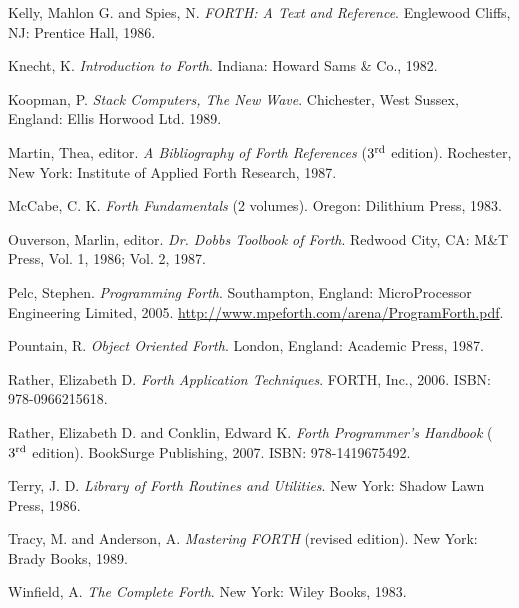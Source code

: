\begin{description}
\begin{description}
	\item Kelly, Mahlon G. and Spies, N.
		\emph{FORTH: A Text and Reference}.
		Englewood Cliffs, NJ: Prentice Hall, 1986.

	\item Knecht, K.
		\emph{Introduction to Forth}.
		Indiana: Howard Sams \& Co., 1982.

	\item Koopman, P.
		\emph{Stack Computers, The New Wave}.
		Chichester, West Sussex, England: Ellis Horwood Ltd. 1989.

	\item Martin, Thea, editor.
		\emph{A Bibliography of Forth References} ($3^{\textrm{\scriptsize rd}}$ edition).
		Rochester, New York: Institute of Applied Forth Research, 1987.

	\item McCabe, C. K.
		\emph{Forth Fundamentals} (2 volumes).
		Oregon: Dilithium Press, 1983.

	\item Ouverson, Marlin, editor.
		\emph{Dr. Dobbs Toolbook of Forth}.
		Redwood City, CA: M\&T Press, Vol. 1, 1986; Vol. 2, 1987.

	\item Pelc, Stephen.
		\emph{Programming Forth}.
		Southampton, England: MicroProcessor Engineering Limited, 2005.
		\url{http://www.mpeforth.com/arena/ProgramForth.pdf}.

	\item Pountain, R.
		\emph{Object Oriented Forth}.
		London, England: Academic Press, 1987.

	\item Rather, Elizabeth D.
		\emph{Forth Application Techniques}.
		FORTH, Inc., 2006.
		ISBN: 978-0966215618.

	\item Rather, Elizabeth D. and Conklin, Edward K.
		\emph{Forth Programmer's Handbook} ($3^{\textrm{\scriptsize rd}}$ edition).
		\linebreak BookSurge Publishing, 2007.
		ISBN: 978-1419675492.

	\item Terry, J. D.
		\emph{Library of Forth Routines and Utilities}.
		New York: Shadow Lawn Press, 1986.

	\item Tracy, M. and Anderson, A.
		\emph{Mastering FORTH} (revised edition).
		New York: Brady Books, 1989.

	\item Winfield, A.
		\emph{The Complete Forth}.
		New York: Wiley Books, 1983.
	\end{description}



\end{description}
